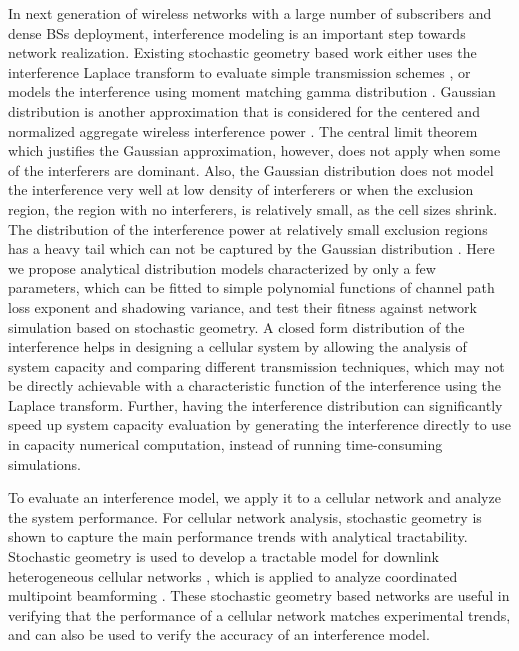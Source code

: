 \documentclass[12pt, draftclsnofoot, onecolumn]{IEEEtran}
\theoremstyle{plain}
\begin{document}
In next generation of wireless networks with a large number of subscribers and dense BSs deployment, interference modeling is an important step towards {network} realization. 
Existing {stochastic geometry based} work either uses the {interference} Laplace transform to evaluate simple transmission schemes \cite{ref3, ref_6}, or models the interference 
using moment matching gamma distribution \cite{HElsawy6524460,heathHetero6515339}. 
 Gaussian distribution is another approximation that is considered for the centered and normalized aggregate wireless interference power \cite{Gaussian_Int_7541571,Gauss_Int_5549941}. The central limit theorem which justifies the Gaussian approximation, however, does not apply when some of the interferers are dominant. Also, the Gaussian distribution does not model the interference very well at low density of interferers or when the exclusion region, the region with no interferers, is relatively small, as the cell sizes shrink. The distribution of the interference power at relatively small exclusion regions has a heavy tail which can not be captured by the Gaussian distribution \cite{Gauss_Int_5549941}.
Here we propose %
analytical distribution models characterized by only a few parameters, which can be fitted to simple polynomial functions of channel path loss exponent and shadowing variance, and test their fitness against network simulation based on stochastic geometry. %
A closed form distribution of the interference helps in designing a cellular system by allowing the analysis of system capacity and comparing different transmission techniques, which may not be directly achievable with a characteristic function of the interference using the Laplace transform. Further, having the interference distribution can significantly speed up system capacity evaluation by generating the interference directly to use in capacity numerical computation, instead of running time-consuming simulations.

To evaluate an interference model, we apply it to a cellular network and analyze the system performance. For cellular network analysis, stochastic geometry %
{is shown to capture the main performance trends with analytical tractability}. 
{Stochastic geometry} is used to develop a tractable model for downlink heterogeneous cellular networks 
\cite{ref_6}, which is applied to analyze coordinated multipoint beamforming \cite{ref3}.
These stochastic geometry based networks are useful in verifying that the performance of a cellular network %
matches experimental trends, and can also be used to verify the accuracy of an interference model.
\vspace{-.2in}
\end{document}
